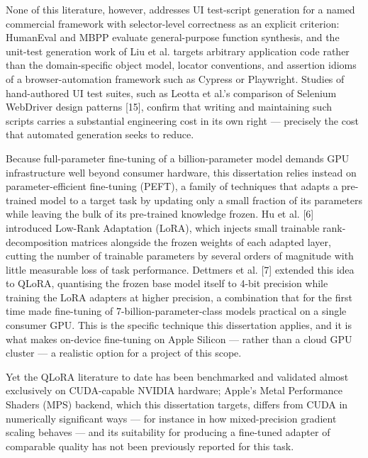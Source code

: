 None of this literature, however, addresses UI test-script generation
for a named commercial framework with selector-level correctness as an
explicit criterion: HumanEval and MBPP evaluate general-purpose function
synthesis, and the unit-test generation work of Liu et al. targets
arbitrary application code rather than the domain-specific object model,
locator conventions, and assertion idioms of a browser-automation
framework such as Cypress or Playwright. Studies of hand-authored UI
test suites, such as Leotta et al.'s comparison of Selenium WebDriver
design patterns {[}15{]}, confirm that writing and maintaining such
scripts carries a substantial engineering cost in its own right ---
precisely the cost that automated generation seeks to reduce.

Because full-parameter fine-tuning of a billion-parameter model demands
GPU infrastructure well beyond consumer hardware, this dissertation
relies instead on parameter-efficient fine-tuning (PEFT), a family of
techniques that adapts a pre-trained model to a target task by updating
only a small fraction of its parameters while leaving the bulk of its
pre-trained knowledge frozen. Hu et al. {[}6{]} introduced Low-Rank
Adaptation (LoRA), which injects small trainable rank-decomposition
matrices alongside the frozen weights of each adapted layer, cutting the
number of trainable parameters by several orders of magnitude with
little measurable loss of task performance. Dettmers et al. {[}7{]}
extended this idea to QLoRA, quantising the frozen base model itself to
4-bit precision while training the LoRA adapters at higher precision, a
combination that for the first time made fine-tuning of
7-billion-parameter-class models practical on a single consumer GPU.
This is the specific technique this dissertation applies, and it is what
makes on-device fine-tuning on Apple Silicon --- rather than a cloud GPU
cluster --- a realistic option for a project of this scope.

Yet the QLoRA literature to date has been benchmarked and validated
almost exclusively on CUDA-capable NVIDIA hardware; Apple's Metal
Performance Shaders (MPS) backend, which this dissertation targets,
differs from CUDA in numerically significant ways --- for instance in
how mixed-precision gradient scaling behaves --- and its suitability for
producing a fine-tuned adapter of comparable quality has not been
previously reported for this task.

